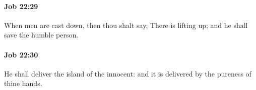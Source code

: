 		\paragraph{Job 22:29} %
			\label{JOB-22-29}

			When men are cast down, then thou shalt say, There is lifting up; and he shall save the humble person.


		\paragraph{Job 22:30} %
			\label{JOB-22-30}

			He shall deliver the island of the innocent: and it is delivered by the pureness of thine hands.

